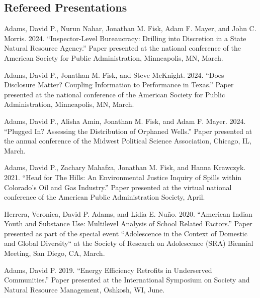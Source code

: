\documentclass[12pt,letterpaper]{article}
\renewenvironment{itemize}{
  \begin{list}{}{
    \setlength{\leftmargin}{1.5em}
    \setlength{\itemsep}{0.25em}
    \setlength{\parskip}{0pt}
    \setlength{\parsep}{0.25em}
  }
}{
  \end{list}
}
\begin{document}
\subsection*{Refereed Presentations}
	\begin{itemize}\leftmargin=2pt\itemindent=-15pt\leftmargin=2pt\itemindent=-15pt

      \item Adams, David P., Nurun Nahar, Jonathan M. Fisk, Adam F. Mayer, and John C. Morris. 2024. ``Inspector-Level Bureaucracy: Drilling into Discretion in a State Natural Resource Agency.'' Paper presented at the national conference of the American Society for Public Administration, Minneapolis, MN, March.
      
      \item Adams, David P., Jonathan M. Fisk, and Steve McKnight. 2024. ``Does Disclosure Matter? Coupling Information to Performance in Texas.'' Paper presented at the national conference of the American Society for Public Administration, Minneapolis, MN, March.
      
      \item Adams, David P., Alisha Amin, Jonathan M. Fisk, and Adam F. Mayer. 2024. ``Plugged In? Assessing the Distribution of Orphaned Wells.'' Paper presented at the annual conference of the Midwest Political Science Association, Chicago, IL, March.
      
      \item Adams, David P., Zachary Mahafza, Jonathan M. Fisk, and Hanna Krawczyk. 2021. ``Head for The Hills: An Environmental Justice Inquiry of Spills within Colorado's Oil and Gas Industry.'' Paper presented at the virtual national conference of the American Public Administration Society, April.
      
      \item Herrera, Veronica, David P. Adams, and Lidia E. Nuño. 2020. ``American Indian Youth and Substance Use: Multilevel Analysis of School Related Factors.'' Paper presented as part of the special event ``Adolescence in the Context of Domestic and Global Diversity`` at the Society of Research on Adolescence (SRA) Biennial Meeting, San Diego, CA, March.
      
      \item Adams, David P. 2019. ``Energy Efficiency Retrofits in Underserved Communities.'' Paper presented at the International Symposium on Society and Natural Resource Management, Oshkosh, WI, June.
      

\end{itemize}
\end{document}
